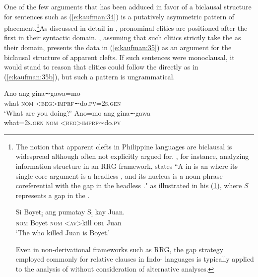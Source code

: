 \documentclass[output=paper]{langsci/langscibook}
\begin{document}
\noindent
One of the few arguments that has been adduced in favor of a biclausal structure for sentences such as (\ref{e:kaufman:34}) is a putatively asymmetric pattern of  placement.\footnote{The notion that apparent clefts in Philippine languages are biclausal is widespread although often not explicitly argued for. \citet[348]{Nagaya:2007}, for instance, analyzing  information structure in an RRG framework, states  ``A  in  is an  where its single core argument is a headless , and its nucleus is a noun phrase coreferential with the gap in the headless ." as illustrated in his (\ref{e:kaufman:34.5}), where \textit{S} represents a gap in the . 

\begin{exe}
	\ex\label{e:kaufman:34.5}
	\gll Si Boyet\textsubscript{i} ang {\ob}p{\USSmaller}um{\USGreater}atay {\ob}S\textsubscript{i}{\cb} kay Juan{\cb}.\\
	\textsc{nom} Boyet \textsc{nom} <\textsc{av}>kill {} \textsc{obl} Juan\\
	\trans`The who killed Juan is Boyet.' \citep[348]{Nagaya:2007}
\end{exe}

Even in non-derivational frameworks such as RRG, the gap strategy employed commonly for relative clauses in Indo- languages is typically applied to the analysis of  without consideration of alternative analyses.}As discussed in detail in \citet{Kaufman:2010a},  pronominal clitics are positioned after the first  in their syntactic domain. \citet[320]{Aldridge:2004}, assuming that such clitics strictly take the  as their domain, presents the data in (\ref{e:kaufman:35}) as an argument for the biclausal structure of apparent clefts. If such sentences were monoclausal, it would stand to reason that clitics could follow the  directly as in (\ref{e:kaufman:35b}), but such a pattern is ungrammatical. 

\begin{exe}
	\ex\label{e:kaufman:35}
	\begin{xlist}
		 \citep[319]{Aldridge:2004}
		\ex\label{e:kaufman:35a}
        \gll Ano ang g{\USSmaller}in{\USGreater}a∼gawa=mo{\USQMark}\\
		what \textsc{nom} <\textsc{beg}>\textsc{imprf}∼do.\textsc{pv}=\textsc{2s.gen}\\
		\glt `What are you doing?'
		\ex\label{e:kaufman:35b}
        \gll {\USStar}Ano=mo ang g{\USSmaller}in{\USGreater}a∼gawa{\USQMark}\\
		\phantom{*}what=\textsc{2s.gen} \textsc{nom} <\textsc{beg}>\textsc{imprf}∼do.\textsc{pv}\\
	\end{xlist}
\end{exe}
\end{document}
